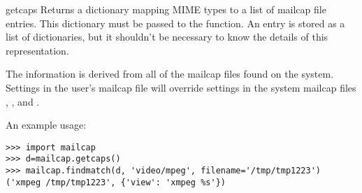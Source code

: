 \begin{funcdesc}{getcaps}{}
Returns a dictionary mapping MIME types to a list of mailcap file
entries. This dictionary must be passed to the 
function.  An entry is stored as a list of dictionaries, but it
shouldn't be necessary to know the details of this representation.

The information is derived from all of the mailcap files found on the
system. Settings in the user's mailcap file 
will override settings in the system mailcap files
, , and
.
\end{funcdesc}

An example usage:
\bcode\begin{verbatim}
>>> import mailcap
>>> d=mailcap.getcaps()
>>> mailcap.findmatch(d, 'video/mpeg', filename='/tmp/tmp1223')
('xmpeg /tmp/tmp1223', {'view': 'xmpeg %s'})
\end{verbatim}\ecode
